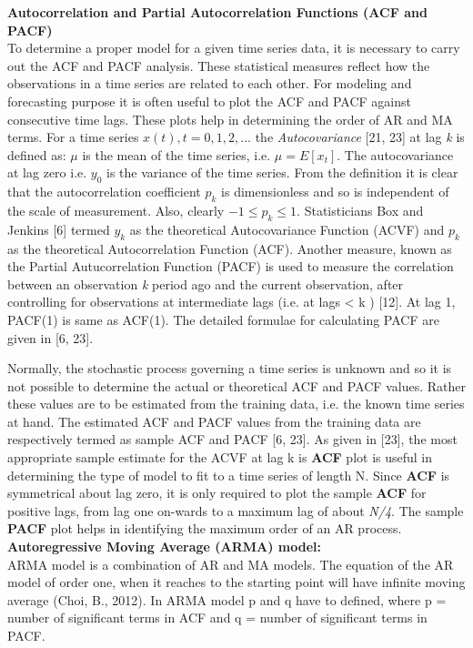 \documentclass[10pt]{report}
\begin{document}
\begin{flushleft}
		\textbf{Autocorrelation and Partial Autocorrelation Functions (ACF and PACF) }\\
		To determine a proper model for a given time series data, it is necessary to carry out the ACF and PACF analysis. These statistical measures reflect how the observations in a time series are related to each other. For modeling and forecasting purpose it is often useful to plot the ACF and PACF against consecutive time lags. These plots help in determining the order of AR and MA terms. For a time series $ {x(t),t = 0,1, 2,...} $ the \emph{Autocovariance} [21, 23] at lag \emph{k} is defined as:
		$\mu$ is the mean of the time series, i.e. $ \mu = E\left[x_{t}\right]  $. The autocovariance at lag zero i.e. $ y_{0} $ is the variance of the time series. From the definition it is clear that the autocorrelation coefficient $ p_{k} $ is dimensionless and so is independent of the scale of measurement. Also, clearly $ -1 \leq p_{k} \leq 1 $. Statisticians Box and Jenkins [6] termed $ y_{k} $ as the theoretical Autocovariance Function (ACVF) and $ p_{k} $ as the theoretical Autocorrelation Function (ACF). 
		Another measure, known as the Partial Autucorrelation Function (PACF) is used to measure the correlation between an observation \emph{k} period ago and the current observation, after controlling for observations at intermediate lags (i.e. at lags < k ) [12]. At lag 1, PACF(1) is same as ACF(1). The detailed formulae for calculating PACF are given in [6, 23]. 
		
		
		
		Normally, the stochastic process governing a time series is unknown and so it is not possible to determine the actual or theoretical ACF and PACF values. Rather these values are to be estimated from the training data, i.e. the known time series at hand. The estimated ACF and PACF values from the training data are respectively termed as sample ACF and PACF [6, 23].  
		As given in [23], the most appropriate sample estimate for the ACVF at lag k is  \textbf{ACF} plot is useful in determining the type of model to fit to a time series of length N. Since \textbf{ACF} is symmetrical about lag zero, it is only required to plot the sample \textbf{ACF} for positive lags, from lag one on-wards to a maximum lag of about \emph{N/4}. The sample \textbf{PACF} plot helps in identifying the maximum order of an AR process.
		\textbf{Autoregressive Moving Average (ARMA) model:}\\
		
		ARMA model is a combination of AR and MA models. The equation of the AR model of order one, when it reaches to the starting point will have infinite moving average (Choi, B., 2012). In ARMA model p and q have to defined, where p = number of significant terms in ACF and q = number of significant terms in PACF.\\
		

\end{flushleft}
\end{document}
